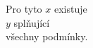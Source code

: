 \documentclass[preview]{standalone}
\begin{document}
\begin{center}
Pro tyto $x$ existuje \\ $y$ splňující \\ všechny podmínky.
\end{center}
\end{document}
